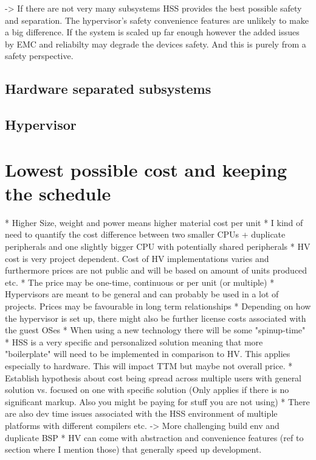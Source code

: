 -> If there are not very many subsystems HSS provides the best possible safety and separation. The hypervisor's safety convenience features are unlikely to make a big difference. If the system is scaled up far enough however the added issues by EMC and reliabilty may degrade the devices safety. And this is purely from a safety perspective.
\subsection{Hardware separated subsystems}
\subsection{Hypervisor}


\section{Lowest possible cost and keeping the schedule}
* Higher Size, weight and power means higher material cost per unit
* I kind of need to quantify the cost difference between two smaller CPUs + duplicate peripherals and one slightly bigger CPU with potentially shared peripherals
* HV cost is very project dependent. Cost of HV implementations varies and furthermore prices are not public and will be based on amount of units produced etc.
    * The price may be one-time, continuous or per unit (or multiple)
* Hypervisors are meant to be general and can probably be used in a lot of projects. Prices may be favourable in long term relationships
* Depending on how the hypervisor is set up, there might also be further license costs associated with the guest OSes 
* When using a new technology there will be some "spinup-time"
* HSS is a very specific and personalized solution meaning that more "boilerplate" will need to be implemented in comparison to HV. This applies especially to hardware. This will impact TTM but maybe not overall price.
    * Establish hypothesis about cost being spread across multiple users with general solution vs. focused on one with specific solution (Only applies if there is no significant markup. Also you might be paying for stuff you are not using)
* There are also dev time issues associated with the HSS environment of multiple platforms with different compilers etc. -> More challenging build env and duplicate BSP
* HV can come with abstraction and convenience features (ref to section where I mention those) that generally speed up development.

